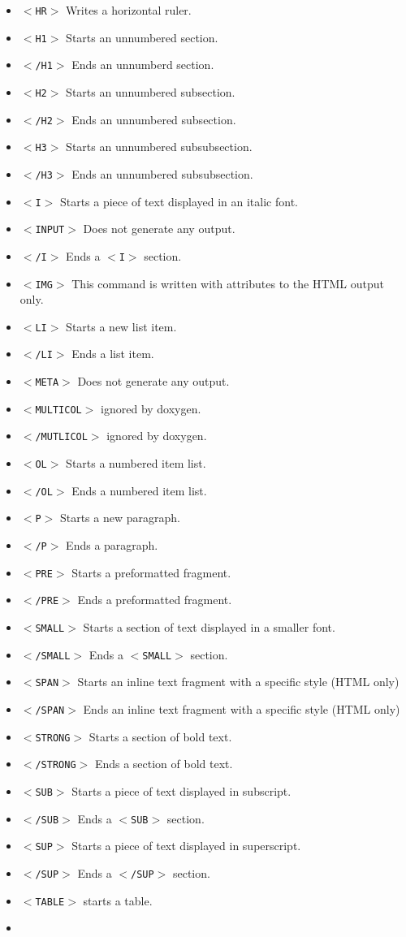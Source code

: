 \begin{itemize}
\item {\tt $<$HR$>$} Writes a horizontal ruler. \item {\tt $<$H1$>$} Starts an unnumbered section. \item {\tt $<$/H1$>$} Ends an unnumberd section. \item {\tt $<$H2$>$} Starts an unnumbered subsection. \item {\tt $<$/H2$>$} Ends an unnumbered subsection. \item {\tt $<$H3$>$} Starts an unnumbered subsubsection. \item {\tt $<$/H3$>$} Ends an unnumbered subsubsection. \item {\tt $<$I$>$} Starts a piece of text displayed in an italic font. \item {\tt $<$INPUT$>$} Does not generate any output. \item {\tt $<$/I$>$} Ends a {\tt $<$I$>$} section. \item {\tt $<$IMG$>$} This command is written with attributes to the HTML output only. \item {\tt $<$LI$>$} Starts a new list item. \item {\tt $<$/LI$>$} Ends a list item. \item {\tt $<$META$>$} Does not generate any output. \item {\tt $<$MULTICOL$>$} ignored by doxygen. \item {\tt $<$/MUTLICOL$>$} ignored by doxygen. \item {\tt $<$OL$>$} Starts a numbered item list. \item {\tt $<$/OL$>$} Ends a numbered item list. \item {\tt $<$P$>$} Starts a new paragraph. \item {\tt $<$/P$>$} Ends a paragraph. \item {\tt $<$PRE$>$} Starts a preformatted fragment. \item {\tt $<$/PRE$>$} Ends a preformatted fragment. \item {\tt $<$SMALL$>$} Starts a section of text displayed in a smaller font. \item {\tt $<$/SMALL$>$} Ends a {\tt $<$SMALL$>$} section. \item {\tt $<$SPAN$>$} Starts an inline text fragment with a specific style (HTML only) \item {\tt $<$/SPAN$>$} Ends an inline text fragment with a specific style (HTML only) \item {\tt $<$STRONG$>$} Starts a section of bold text. \item {\tt $<$/STRONG$>$} Ends a section of bold text. \item {\tt $<$SUB$>$} Starts a piece of text displayed in subscript. \item {\tt $<$/SUB$>$} Ends a {\tt $<$SUB$>$} section. \item {\tt $<$SUP$>$} Starts a piece of text displayed in superscript. \item {\tt $<$/SUP$>$} Ends a {\tt $<$/SUP$>$} section. \item {\tt $<$TABLE$>$} starts a table. \item 
\end{itemize}
